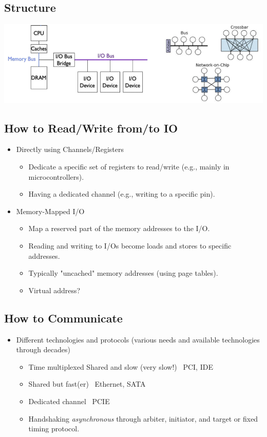 \documentclass[10pt]{article}
\begin{document}
\subsection*{Structure}
\begin{center}
    \includegraphics*[scale=0.6]{W10_2.png}
\end{center}
\subsection*{How to Read/Write from/to IO}
\begin{itemize}
    \item Directly using Channels/Registers
    \begin{itemize}
        \item Dedicate a specific set of registers to read/write (e.g., mainly in microcontrollers).
        \item Having a dedicated channel (e.g., writing to a specific pin).
    \end{itemize}
    \item Memory-Mapped I/O
    \begin{itemize}
        \item Map a reserved part of the memory addresses to the I/O.
        \item Reading and writing to I/Os become loads and stores to specific addresses.
        \item Typically "uncached" memory addresses (using page tables).
        \item Virtual address?
    \end{itemize}
\end{itemize}

\subsection*{How to Communicate}
\begin{itemize}
    \item Different technologies and protocols (various needs and available technologies through decades)
    \begin{itemize}
        \item Time multiplexed Shared and slow (very slow!) \textrightarrow~PCI, IDE
        \item Shared but fast(er) \textrightarrow~Ethernet, SATA
        \item Dedicated channel \textrightarrow~PCIE
        \item Handshaking \textit{asynchronous} through arbiter, initiator, and target or fixed timing protocol.
    \end{itemize}
\end{itemize}
\end{document}
